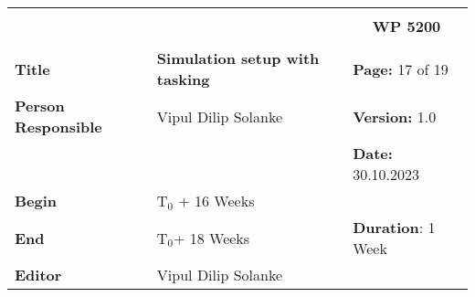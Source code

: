 \begin{table}[!h]
  \begin{center}
    \begin{tabular}{|p{35mm}||p{55mm}|p{50mm}||p{40mm}|}
      \hline
      \multicolumn{3}{|l||}{\textbf{}} & \multicolumn{1}{c|}{}                                                                                                                                                \\
      \multicolumn{3}{|l||}{\textbf{}} & \multicolumn{1}{c|}{\textbf{WP 5200}}                                                                                                                                \\
      \multicolumn{3}{|l||}{\textbf{}} & \multicolumn{1}{c|}{}                                                                                                                                                \\
      \hline\hline
      \textbf{Title}                   & \multicolumn{2}{p{7cm}||}{\textbf{Simulation setup with tasking}}
                                       & \textbf{Page:} 17 of 19                                                                                                                                              \\
      \hline
      \textbf{Person Responsible}        & \multicolumn{2}{l||}{Vipul Dilip Solanke}                                                                                                   & \textbf{Version:} 1.0   \\
      \hline
      \multicolumn{3}{|l||}{}          & \textbf{Date:} 30.10.2023                                                                                                                                          \\
      \hline\hline
      \textbf{Begin}                  & \multicolumn{2}{l||}{T$_0$ + 16 Weeks}                                                                                                                &                         \\
      \hline
      \textbf{End}                    & \multicolumn{2}{l||}{T$_0$+ 18 Weeks}                                                                                                        & \textbf{Duration}: 1 Week \\
      \hline\hline
      \textbf{Editor}              & \multicolumn{3}{l|}{Vipul Dilip Solanke}                                                                                                                              \\

\end{tabular}
\end{center}
\end{table}
